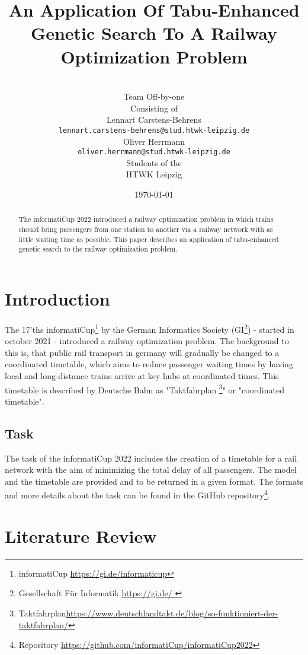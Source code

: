 \documentclass[a4paper,12pt,parskip]{article}
\title{An Application Of Tabu-Enhanced Genetic Search To A Railway Optimization Problem}
\author{
    \\ [1cm]
    \Large Team Off-by-one \\ [0.5cm]
    \normalsize Consisting of \\ [0.5cm]
    \normalsize Lennart Carstens-Behrens \\
    \texttt{lennart.carstens-behrens@stud.htwk-leipzig.de} \\
    \normalsize Oliver Herrmann \\
    \texttt{oliver.herrmann@stud.htwk-leipzig.de} \\ [0.5cm]
    \normalsize Students of the \\ [0.5cm]
    \normasize HTWK Leipzig \\ [1.5cm]
}
\date{\today}
\begin{document}
\maketitle

\vfill

\begin{abstract}
The informatiCup 2022 introduced a railway optimization problem in which trains 
should bring passengers from one station to another via a railway network with 
as little waiting time as possible. This paper describes an application of 
tabu-enhanced genetic search to the railway optimization problem.
\end{abstract}

\newpage

\tableofcontents

\newpage

\section{Introduction}

The 17'ths informatiCup\footnote{informatiCup \url{https://gi.de/informaticup}} 
by the German Informatics Society (GI\footnote{Gesellschaft Für Informatik \url{ https://gi.de/ }}) - 
started in october 2021 - introduced a railway optimization problem. The 
background to this is, that public rail transport in germany will gradually be 
changed to a coordinated timetable, which aims to reduce passenger waiting times 
by having local and long-distance trains arrive at key hubs at coordinated times. 
This timetable is described by Deutsche Bahn as 
"Taktfahrplan \footnote{Taktfahrplan\url{https://www.deutschlandtakt.de/blog/so-funktioniert-der-taktfahrplan/}}" 
or "coordinated timetable".

\subsection{Task}

The task of the informatiCup 2022 includes the creation of a timetable for a rail 
network with the aim of minimizing the total delay of all passengers. The model 
and the timetable are provided and to be returned in a given format. The formats 
and more details about the task can be found in the GitHub 
repository\footnote{Repository \url{https://github.com/informatiCup/informatiCup2022}}.

\section{Literature Review}
\end{document}
